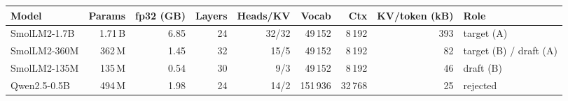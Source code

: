 \begin{tabular}{lrrrrrrrl}\toprule
Model & Params & fp32 (GB) & Layers & Heads/KV & Vocab & Ctx & KV/token (kB) & Role \\\midrule
SmolLM2-1.7B & 1.71\,B & 6.85 & 24 & 32/32 & 49\,152 & 8\,192 & 393 & target (A) \\
SmolLM2-360M & 362\,M & 1.45 & 32 & 15/5 & 49\,152 & 8\,192 & 82 & target (B) / draft (A) \\
SmolLM2-135M & 135\,M & 0.54 & 30 & 9/3 & 49\,152 & 8\,192 & 46 & draft (B) \\
Qwen2.5-0.5B & 494\,M & 1.98 & 24 & 14/2 & 151\,936 & 32\,768 & 25 & rejected \\
\bottomrule\end{tabular}

